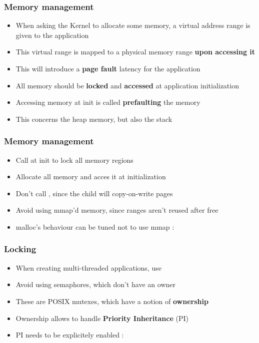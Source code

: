 
\begin{frame}
	\frametitle{Memory management}
	\begin{itemize}
		\item When asking the Kernel to allocate some memory, a virtual address range is given to the application
		\item This virtual range is mapped to a physical memory range \textbf{upon accessing it}
		\item This will introduce a \textbf{page fault} latency for the application
		\item All memory should be \textbf{locked} and \textbf{accessed} at application initialization
		\item Accessing memory at init is called \textbf{prefaulting} the memory
		\item This concerns the heap memory, but also the stack
	\end{itemize}
\end{frame}

\begin{frame}
	\frametitle{Memory management}
	\begin{itemize}
		\item Call  at init to lock all memory regions
		\item Allocate all memory and acces it at initialization
		\item Don't call , since the child will copy-on-write pages
		\item Avoid using mmap'd memory, since ranges aren't reused after free
		\item malloc's behaviour can be tuned not to use mmap : 
	\end{itemize}
\end{frame}

\begin{frame}
	\frametitle{Locking}
	\begin{itemize}
		\item When creating multi-threaded applications, use 
		\item Avoid using semaphores, which don't have an owner
		\item These are POSIX mutexes, which have a notion of \textbf{ownership}
		\item Ownership allows to handle \textbf{Priority Inheritance} (PI)
		\item PI needs to be explicitely enabled : 
	\end{itemize}
\end{frame}

